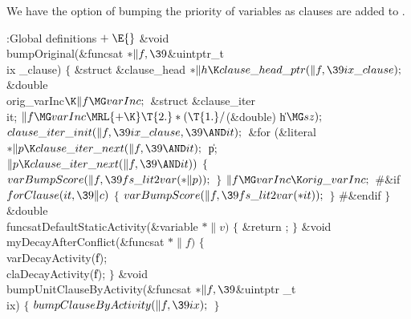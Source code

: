 {{{{{We have the option of bumping the priority of variables as clauses are
added
to \funcsat.

\Y\B\4:Global definitions\X${}\mathrel+\E{}$\6
\&{void} \\{bumpOriginal}(\&{funcsat} ${}{*}\|f,\39{}$\&{uintptr\_t} \\{ix%
\_clause})\1\1\2\2\6
${}\{{}$\1\6
\&{struct} \&{clause\_head} ${}{*}\|h\K\\{clause\_head\_ptr}(\|f,\39\\{ix%
\_clause});{}$\6
\&{double} \\{orig\_varInc}${}\K\|f\MG\\{varInc};{}$\6
\&{struct} \&{clause\_iter} \\{it};\7
${}\|f\MG\\{varInc}\MRL{+{\K}}\T{2.}*(\T{1.}/{}$(\&{double}) \|h${}\MG%
\\{sz});{}$\6
${}\\{clause\_iter\_init}(\|f,\39\\{ix\_clause},\39{\AND}\\{it});{}$\6
\&{for} (\&{literal} ${}{*}\|p\K\\{clause\_iter\_next}(\|f,\39{\AND}\\{it});{}$
\|p; ${}\|p\K\\{clause\_iter\_next}(\|f,\39{\AND}\\{it})){}$\5
${}\{{}$\1\6
${}\\{varBumpScore}(\|f,\39\\{fs\_lit2var}({*}\|p));{}$\6
\4${}\}{}$\2\6
${}\|f\MG\\{varInc}\K\\{orig\_varInc};{}$\6
\8\#\&{if} \7
${}\\{forClause}(\\{it},\39\|c){}$\1\1\2\2\6
${}\{{}$\1\6
${}\\{varBumpScore}(\|f,\39\\{fs\_lit2var}({*}\\{it}));{}$\6
\4${}\}{}$\2\6
\8\#\&{endif}\6
\4${}\}{}$\2\7
\&{double} \\{funcsatDefaultStaticActivity}(\&{variable} ${}{*}\|v){}$\1\1\2\2\6
${}\{{}$\1\6
\&{return} ;\6
\4${}\}{}$\2\7
\&{void} \\{myDecayAfterConflict}(\&{funcsat} ${}{*}\|f){}$\1\1\2\2\6
${}\{{}$\1\6
\\{varDecayActivity}(\|f);\6
\\{claDecayActivity}(\|f);\6
\4${}\}{}$\2\7
\&{void} \\{bumpUnitClauseByActivity}(\&{funcsat} ${}{*}\|f,\39{}$\&{uintptr%
\_t} \\{ix})\1\1\2\2\6
${}\{{}$\1\6
${}\\{bumpClauseByActivity}(\|f,\39\\{ix});{}$\6
\4${}\}{}$\2\par
\fi

}}}}}
